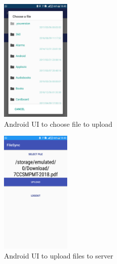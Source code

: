 \documentclass[11pt]{article}
\begin{document}
\begin{figure} [H]
\caption{Android UI to choose file to upload}
\centering
\includegraphics[width=0.3\textwidth]{Group_Project/choose.png}
\end{figure}

\begin{figure} [H]
\caption{Android UI to upload files to server}
\centering
\includegraphics[width=0.3\textwidth]{Group_Project/upload.png}
\end{figure}
\end{document}
